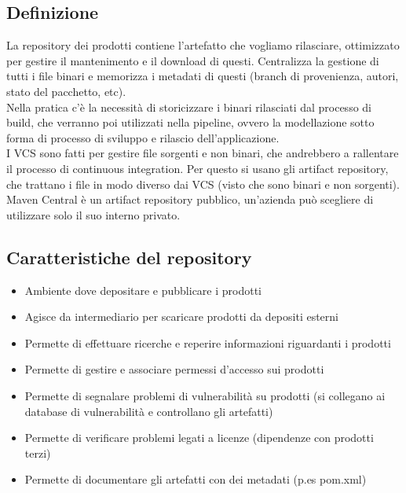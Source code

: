 \documentclass[10pt, a4paper]{article}
\begin{document}
\subsection{Definizione}
La repository dei prodotti contiene l'artefatto che vogliamo rilasciare, ottimizzato per gestire il mantenimento e il download di questi. Centralizza la gestione di tutti i file binari e memorizza i metadati di questi (branch di provenienza, autori, stato del pacchetto, etc).\\
Nella pratica c'è la necessità di storicizzare i binari rilasciati dal processo di build, che verranno poi utilizzati nella pipeline, ovvero la modellazione sotto forma di processo di sviluppo e rilascio dell'applicazione.\\
I VCS sono fatti per gestire file sorgenti e non binari, che andrebbero a rallentare il processo di continuous integration. Per questo si usano gli artifact repository, che trattano i file in modo diverso dai VCS (visto che sono binari e non sorgenti).\\
Maven Central è un artifact repository pubblico, un'azienda può scegliere di utilizzare solo il suo interno privato.

\subsection{Caratteristiche del repository}
\begin{itemize}
    \item Ambiente dove depositare e pubblicare i prodotti
    \item Agisce da intermediario per scaricare prodotti da depositi esterni
    \item Permette di effettuare ricerche e reperire informazioni riguardanti i prodotti
    \item Permette di gestire e associare permessi d’accesso sui prodotti
    \item Permette di segnalare problemi di vulnerabilità su prodotti (si collegano ai database di vulnerabilità e controllano gli artefatti)
    \item Permette di verificare problemi legati a licenze (dipendenze con prodotti terzi)
    \item Permette di documentare gli artefatti con dei metadati (p.es pom.xml)
\end{itemize}
\end{document}
